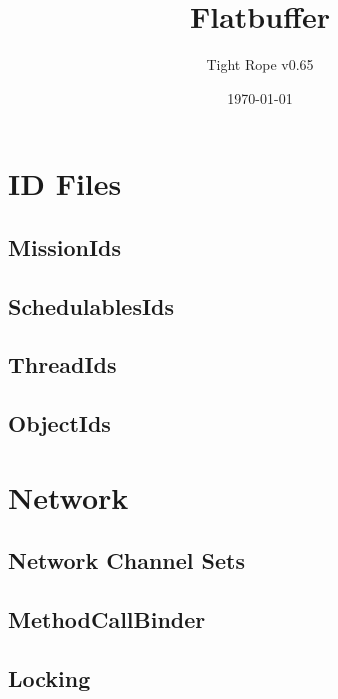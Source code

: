 \documentclass[10pt,a4paper]{article}
\title{Flatbuffer}
\author{Tight Rope v0.65}
\date{\today}
\begin{document}
\maketitle

\section{ID Files}
\subsection{MissionIds}

\newpage

\subsection{SchedulablesIds}

\newpage

\subsection{ThreadIds}

\newpage

\subsection{ObjectIds}

\newpage

\section{Network}
\subsection{Network Channel Sets}


\newpage



\subsection{MethodCallBinder}





\newpage

\subsection{Locking}

\end{document}
